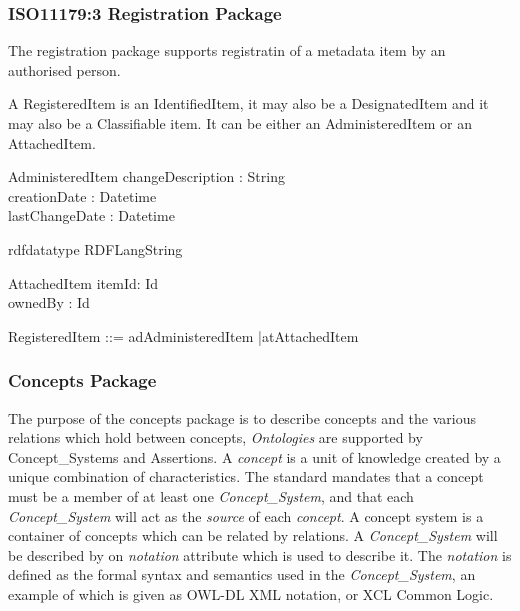 \documentclass{llncs}
\begin{document}
\subsubsection{ISO11179:3 Registration Package}

The registration package supports registratin of a metadata item by an authorised person. 

A RegisteredItem is an IdentifiedItem, it may also be a DesignatedItem and it may also be a Classifiable item. It can be either an AdministeredItem or an AttachedItem.


\begin{zed}
\end{zed}
\begin{schema}{AdministeredItem}
changeDescription : String \\
creationDate : Datetime \\
lastChangeDate : Datetime\\
\where  
 
rdfdatatype \neq RDFLangString
\end{schema}

\begin{schema}{AttachedItem}
itemId: Id \\
ownedBy : Id
\end{schema}
 
\begin{zed}
RegisteredItem ::=  ad\ldata AdministeredItem \rdata |at\ldata AttachedItem \rdata
\end{zed}


\subsubsection{Concepts Package}
The purpose of the concepts package is to describe concepts and the various relations which hold between concepts, \emph{Ontologies} are supported by Concept\_Systems and Assertions. A \emph{concept} is a unit of knowledge created by a unique combination of characteristics. The standard mandates that a concept must be a member of at least one \emph{Concept\_System}, and that each \emph{Concept\_System} will act as the \emph{source} of each \emph{concept}. A concept system is a container of concepts which can be related by relations. A \emph{Concept\_System} will be described by on \emph{notation} attribute which is used to describe it. The \emph{notation} is defined as the formal syntax and semantics used in the  \emph{Concept\_System}, an example of which is given as OWL-DL XML notation, or XCL Common Logic.
\end{document}
